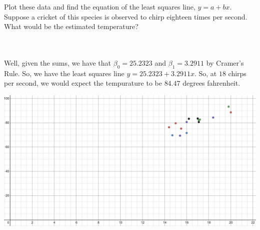 Plot these data and find the equation of the least squares line, $y=a+bx$. Suppose a cricket of this
species is observed to chirp eighteen times per second. What would be the estimated temperature?\\\\

\begin{solution}\renewcommand{\qedsymbol}{}\ \\
    Well, given the sums, we have that $\beta_0=25.2323$ and $\beta_1=3.2911$ by Cramer's Rule. So, we
    have the least squares line $y=25.2323+3.2911x$. So, at $18$ chirps per second, we would expect the
    tempurature to be $84.47$ degrees fahrenheit.\\

    \begin{center}
        \includegraphics[scale=0.5]{11-2-1.JPG}
    \end{center}

\end{solution}